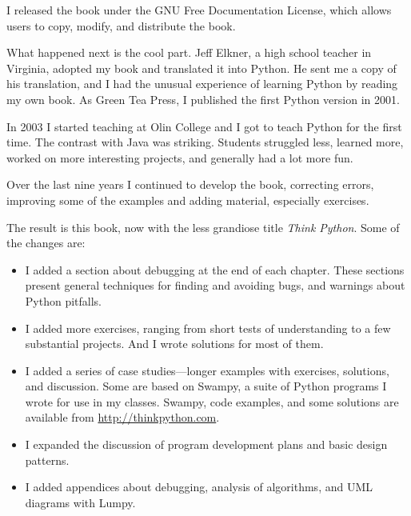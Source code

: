 \documentclass[10pt]{book}
\begin{document}
I released the book under the GNU Free Documentation License,
which allows users to copy, modify, and distribute the book.

What happened next is the cool part.  Jeff Elkner, a high school
teacher in Virginia, adopted my book and translated it into
Python.  He sent me a copy of his translation, and I had the
unusual experience of learning Python by reading my own book.
As Green Tea Press, I published the first Python version in 2001.

In 2003 I started teaching at Olin College and I got to teach
Python for the first time.  The contrast with Java was striking.
Students struggled less, learned more, worked on more interesting
projects, and generally had a lot more fun.

Over the last nine years I continued to develop the book,
correcting errors, improving some of the examples and
adding material, especially exercises.

The result is this book, now with the less grandiose title
{\em Think Python}.  Some of the changes are:

\begin{itemize}

\item I added a section about debugging at the end of each chapter.
  These sections present general techniques for finding and avoiding
  bugs, and warnings about Python pitfalls.

\item I added more exercises, ranging from short tests of
  understanding to a few substantial projects.  And I wrote
  solutions for most of them.

\item I added a series of case studies---longer examples with
  exercises, solutions, and discussion.  Some are based on
  Swampy, a suite of Python programs I wrote for use in my classes.
  Swampy, code examples, and some solutions are available from
  \url{http://thinkpython.com}.

\item I expanded the discussion of program development plans
  and basic design patterns.

\item I added appendices about debugging, analysis of algorithms, and
  UML diagrams with Lumpy.

\end{itemize}
\end{document}

